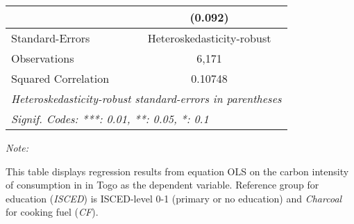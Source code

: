 \begin{table}[htbp!]
\begin{adjustbox}{width = 1\textwidth, max height = 0.95\textheight, center}
\begin{threeparttable}[b]
\begin{tabular}{lc}
                                & (0.092)\\   
            \midrule 
            Standard-Errors     & Heteroskedasticity-robust \\   
            Observations        & 6,171\\  
            Squared Correlation & 0.10748\\  
            \midrule \midrule
            \multicolumn{2}{l}{\emph{Heteroskedasticity-robust standard-errors in parentheses}}\\
            \multicolumn{2}{l}{\emph{Signif. Codes: ***: 0.01, **: 0.05, *: 0.1}}\\
         \end{tabular}
         
         \begin{tablenotes}\item \medskip \textit{Note:}
            \item This table displays regression results from equation OLS on the carbon intensity of consumption in  in Togo as the dependent variable. Reference group for education (\textit{ISCED}) is ISCED-level 0-1 (primary or no education) and \textit{Charcoal} for cooking fuel (\textit{CF}).
         \end{tablenotes}
      \end{threeparttable}
   \end{adjustbox}
\end{table}


